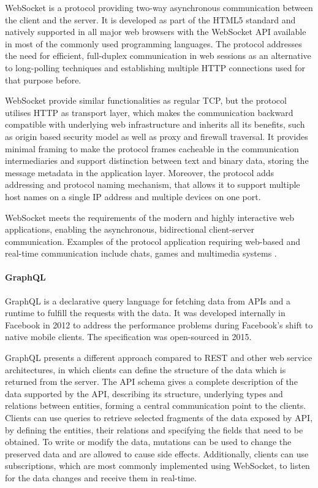 WebSocket \cite{WebSocketRFC} is a protocol providing two-way asynchronous communication between the client and the server. It is developed as part of the HTML5 standard and natively supported in all major web browsers with the WebSocket API available in most of the commonly used programming languages. The protocol addresses the need for efficient, full-duplex communication in web sessions as an alternative to long-polling techniques and establishing multiple HTTP connections used for that purpose before.

WebSocket provide similar functionalities as regular TCP, but the protocol utilises HTTP as transport layer, which makes the communication backward compatible with underlying web infrastructure and inherits all its benefits, such as origin based security model as well as proxy and firewall traversal. It provides minimal framing to make the protocol frames cacheable in the communication intermediaries and support distinction between text and binary data, storing the message metadata in the application layer. Moreover, the protocol adds addressing and protocol naming mechanism, that allows it to support multiple host names on a single IP address and multiple devices on one port.

WebSocket meets the requirements of the modern and highly interactive web applications, enabling the asynchronous, bidirectional client-server communication. Examples of the protocol application requiring web-based and real-time communication include chats, games and multimedia systems \cite{PerfomranceEvaluationonWebsocketProtocol}.

\paragraph{GraphQL}

GraphQL \cite{GraphQL} is a declarative query language for fetching data from APIs and a runtime to fulfill the requests with the data. It was developed internally in Facebook in 2012 to address the performance problems during Facebook's shift to native mobile clients. The specification was open-sourced in 2015.

GraphQL presents a different approach compared to REST and other web service architectures, in which clients can define the structure of the data which is returned from the server. The API schema gives a complete description of the data supported by the API, describing its structure, underlying types and relations between entities, forming a central communication point to the clients.
Clients can use queries to retrieve selected fragments of the data exposed by API, by defining the entities, their relations and specifying the fields that need to be obtained. To write or modify the data, mutations can be used to change the preserved data and are allowed to cause side effects.
Additionally, clients can use subscriptions, which are most commonly implemented using WebSocket, to listen for the data changes and receive them in real-time.

